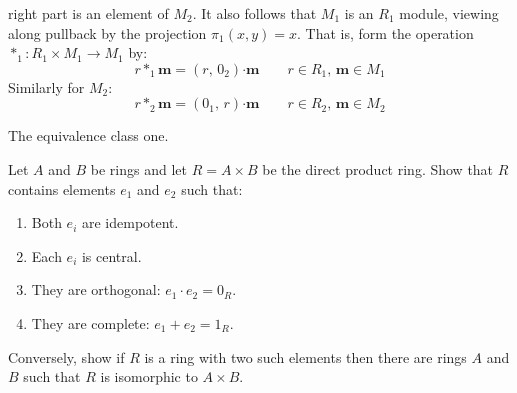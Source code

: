 \documentclass[crop=false,class=article]{standalone}                       %
\begin{document}
\begin{solution}
            right part is an element of $M_{2}$. It also follows that
            $M_{1}$ is an $R_{1}$ module, viewing along pullback by the
            projection $\pi_{1}(x,y)=x$. That is, form the operation
            $*_{1}:R_{1}\times{M}_{1}\rightarrow{M}_{1}$ by:
            \begin{equation}
                r*_{1}\mathbf{m}=(r,\,0_{2})\boldsymbol{\cdot}\mathbf{m}
                \quad\quad
                r\in{R}_{1},\,\mathbf{m}\in{M}_{1}
            \end{equation}
            Similarly for $M_{2}$:
            \begin{equation}
                r*_{2}\mathbf{m}=(0_{1},\,r)\boldsymbol{\cdot}\mathbf{m}
                \quad\quad
                r\in{R}_{2},\,\mathbf{m}\in{M}_{2}
            \end{equation}
        \end{solution}
        \begin{problem}
            The equivalence class one.
        \end{problem}
        \begin{problem}
            Let $A$ and $B$ be rings and let $R=A\times{B}$ be the
            direct product ring. Show that $R$ contains elements $e_{1}$
            and $e_{2}$ such that:
            \begin{enumerate}
                \item Both $e_{i}$ are idempotent.
                \item Each $e_{i}$ is central.
                \item They are orthogonal: $e_{1}\cdot{e}_{2}=0_{R}$.
                \item They are complete: $e_{1}+e_{2}=1_{R}$.
            \end{enumerate}
            Conversely, show if $R$ is a ring with two such elements then
            there are rings $A$ and $B$ such that $R$ is isomorphic to
            $A\times{B}$.
        \end{problem}
\end{document}
